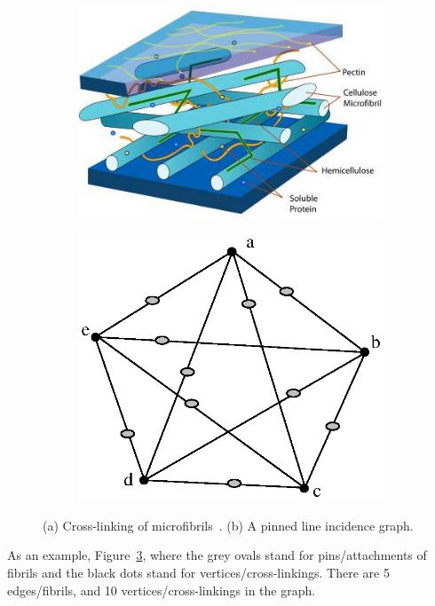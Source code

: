 \begin{figure}
\centering
\begin{subfigure}{.5\linewidth}
  \centering
  \includegraphics[width=\linewidth]{img/crosslink}
  \caption{}
  \label{fig:sub1}
\end{subfigure}%
\begin{subfigure}{.5\linewidth}
  \centering
  \includegraphics[width=.8\linewidth]{img/teq1}
  \caption{}
  \label{fig:sub2}
\end{subfigure}
\caption{(a) Cross-linking of microfibrils~\cite{xxx}. (b) A pinned line incidence graph.}
\label{fig:cross-linking}
\end{figure}


As an example, Figure~\ref{fig:cross-linking}, 
where the grey ovals stand for pins/attachments of fibrils and the black dots stand for vertices/cross-linkings.
There are 5 edges/fibrils,  and 10 vertices/cross-linkings in the graph.




